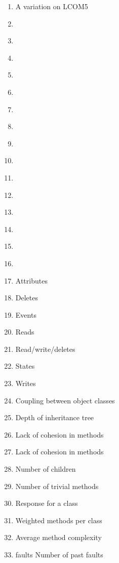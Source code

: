 \documentclass{article}
\begin{document}
{\begin{pptWide}{5}
\begin{enumerate}
\item \textbf{} A variation on LCOM5
\item \textbf{}
\item \textbf{}
\item \textbf{}
\item \textbf{}
\item \textbf{}
\item \textbf{}
\item \textbf{}
\item \textbf{}
\item \textbf{}
\item \textbf{}
\item \textbf{}
\item \textbf{}
\item \textbf{}
\item \textbf{}
\item \textbf{}
\item \textbf{} Attributes
\item \textbf{} Deletes
\item \textbf{} Events
\item \textbf{} Reads
\item \textbf{} Read/write/deletes
\item \textbf{} States
\item \textbf{} Writes
\item \textbf{} Coupling between object classes
\item \textbf{} Depth of inheritance tree
\item \textbf{} Lack of cohesion in methods
\item \textbf{} Lack of cohesion in methods
\item \textbf{} Number of children
\item \textbf{} Number of trivial methods
\item \textbf{} Response for a class
\item \textbf{} Weighted methods per class
\item \textbf{} Average method complexity
\item \textbf{} faults Number of past faults

\end{enumerate}
\end{pptWide}}
\end{document}
